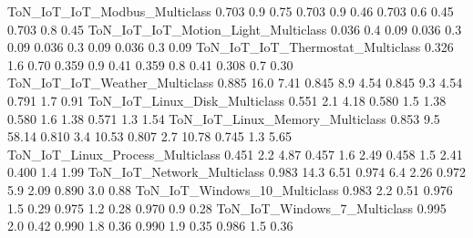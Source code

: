 ToN_IoT_IoT_Modbus_Multiclass                                         0.703       0.9      0.75      0.703          0.9         0.46      0.703          0.6         0.45       0.703           0.8          0.45
ToN_IoT_IoT_Motion_Light_Multiclass                                   0.036       0.4      0.09      0.036          0.3         0.09      0.036          0.3         0.09       0.036           0.3          0.09
ToN_IoT_IoT_Thermostat_Multiclass                                     0.326       1.6      0.70      0.359          0.9         0.41      0.359          0.8         0.41       0.308           0.7          0.30
ToN_IoT_IoT_Weather_Multiclass                                        0.885      16.0      7.41      0.845          8.9         4.54      0.845          9.3         4.54       0.791           1.7          0.91
ToN_IoT_Linux_Disk_Multiclass                                         0.551       2.1      4.18      0.580          1.5         1.38      0.580          1.6         1.38       0.571           1.3          1.54
ToN_IoT_Linux_Memory_Multiclass                                       0.853       9.5     58.14      0.810          3.4        10.53      0.807          2.7        10.78       0.745           1.3          5.65
ToN_IoT_Linux_Process_Multiclass                                      0.451       2.2      4.87      0.457          1.6         2.49      0.458          1.5         2.41       0.400           1.4          1.99
ToN_IoT_Network_Multiclass                                            0.983      14.3      6.51      0.974          6.4         2.26      0.972          5.9         2.09       0.890           3.0          0.88
ToN_IoT_Windows_10_Multiclass                                         0.983       2.2      0.51      0.976          1.5         0.29      0.975          1.2         0.28       0.970           0.9          0.28
ToN_IoT_Windows_7_Multiclass                                          0.995       2.0      0.42      0.990          1.8         0.36      0.990          1.9         0.35       0.986           1.5          0.36